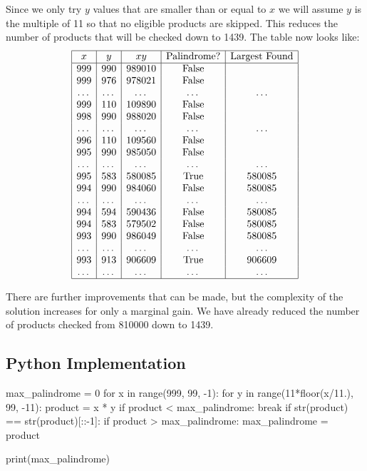 \documentclass{article}
\begin{document}
Since we only try \(y\) values that are smaller than or equal to \(x\) we will assume \(y\) is the multiple of 11 so that no eligible products are skipped. This reduces the number of products that will be checked down to 1439. The table now looks like:
\[\begin{array}{|c|c|c|c|c|}
    \hline
    x & y & xy & \text{Palindrome?} & \text{Largest Found} \\
    \hline
    999 & 990 & 989010 & \text{False} & \\
    999 & 976 & 978021 & \text{False} & \\
    \dots & \dots & \dots & \dots & \dots \\
    999 & 110 & 109890 & \text{False} & \\
    998 & 990 & 988020 & \text{False} & \\
    \dots & \dots & \dots & \dots & \dots \\
    996 & 110 & 109560 & \text{False} & \\
    995 & 990 & 985050 & \text{False} & \\
    \dots & \dots & \dots & \dots & \dots \\
    995 & 583 & 580085 & \text{True} & 580085 \\
    994 & 990 & 984060 & \text{False} & 580085 \\
    \dots & \dots & \dots & \dots & \dots \\
    994 & 594 & 590436 & \text{False} & 580085 \\
    994 & 583 & 579502 & \text{False} & 580085 \\
    993 & 990 & 986049 & \text{False} & 580085 \\
    \dots & \dots & \dots & \dots & \dots \\
    993 & 913 & 906609 & \text{True} & 906609 \\
    \dots & \dots & \dots & \dots & \dots \\
    \hline
\end{array}\]

There are further improvements that can be made, but the complexity of the solution increases for only a marginal gain. We have already reduced the number of products checked from 810000 down to 1439.

\pagebreak
\subsection*{Python Implementation}
\begin{pyverbatim}[][frame=single]
max_palindrome = 0
for x in range(999, 99, -1):
    for y in range(11*floor(x/11.), 99, -11):
        product = x * y
        if product < max_palindrome: break
        if str(product) == str(product)[::-1]:
            if product > max_palindrome:
                max_palindrome = product
                
print(max_palindrome)

\end{pyverbatim}
\end{document}
